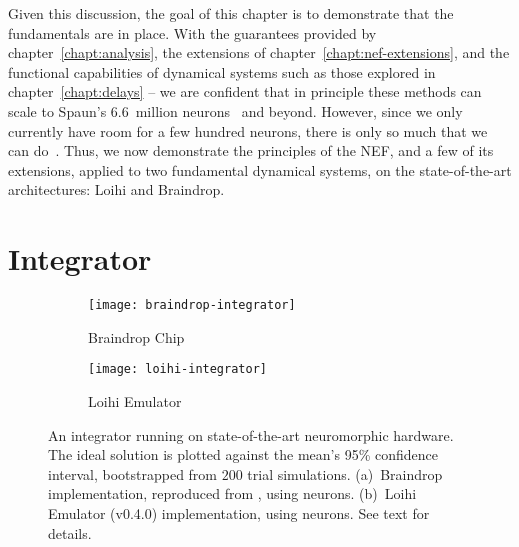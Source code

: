 Given this discussion, the goal of this chapter is to demonstrate that the fundamentals are in place.
With the guarantees provided by chapter~\ref{chapt:analysis}, the extensions of chapter~\ref{chapt:nef-extensions}, and the functional capabilities of dynamical systems such as those explored in chapter~\ref{chapt:delays} -- we are confident that in principle these methods can scale to Spaun's 6.6~million neurons~\citep{choo2018} and beyond.
However, since we only currently have room for a few hundred neurons, there is only so much that we can do~\citep{blouw2018a}.
Thus, we now demonstrate the principles of the NEF, and a few of its extensions, applied to two fundamental dynamical systems, on the state-of-the-art architectures: Loihi and Braindrop.

\section{Integrator}
\label{sec:integrator}

\begin{figure}
  \centering
  \begin{subfigure}{.5\textwidth}
    \centering
    \texttt{[image: braindrop-integrator]}
    \caption{Braindrop Chip}
    \label{fig:dn-braindrop}
  \end{subfigure}%
  \begin{subfigure}{.5\textwidth}
    \centering
    \texttt{[image: loihi-integrator]}
    \caption{Loihi Emulator}
    \label{fig:dn-loihi}
  \end{subfigure}
  \caption{ \label{fig:integrator-neuromorphic}
    An integrator running on state-of-the-art neuromorphic hardware.
    The ideal solution is plotted against the mean's 95\% confidence interval, bootstrapped from $200$ trial simulations.
    (a)~Braindrop implementation, reproduced from \citet[][Figure~15]{braindrop2019}, using  neurons. 
    (b)~Loihi Emulator (v0.4.0) implementation, using  neurons.
    See text for details.
  }
\end{figure}

